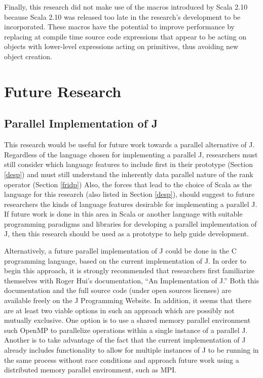 Finally, this research did not make use of the macros introduced by Scala 2.10\cite{scala210} 
because Scala 2.10 was released too late in the research's development to be incorporated.
These macros have the potential to improve performance 
by replacing at compile time source code expressions that appear to be acting on objects 
with lower-level expressions acting on primitives, thus avoiding new object creation.

\section{Future Research}
\subsection{Parallel Implementation of J}
This research would be useful for future work towards a parallel alternative of J.
Regardless of the language chosen for implementing a parallel J, 
researchers must still consider which language features to include first in their prototype (Section \ref{desp})
and must still understand the inherently data parallel nature of the rank operator (Section \ref{fridp})
Also, the forces that lead to the choice of Scala as the language 
for this research (also listed in Section \ref{desp}), 
should suggest to future researchers the kinds of language features desirable 
for implementing a parallel J. 
If future work is done in this area in Scala 
or another language with suitable programming paradigms and libraries 
for developing a parallel implementation of J, 
then this research should be used as a prototype 
to help guide development.

Alternatively, a future parallel implementation of J
could be done in the C programming language, based on the current implementation of J\cite{ioj}. 
In order to begin this approach, 
it is strongly recommended that researchers first 
familiarize themselves with Roger Hui's documentation, ``An Implementation of J.''
Both this documentation and the full source code (under open sources licenses)
are available freely on the J Programming Website.
In addition, it seems that there are at least two viable options in such an approach 
which are possibly not mutually exclusive.
One option is to use a shared memory parallel environment such
OpenMP to parallelize operations within a single instance of a
parallel J. 
Another is to take advantage of the fact that the
current implementation of J already includes functionality to allow
for multiple instances of J to be running in the same process without
race conditions and approach future work using a distributed memory
parallel environment, such as MPI\cite{mpi}.

